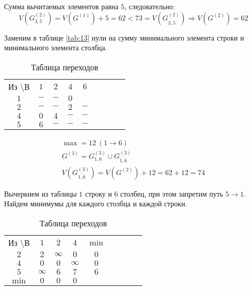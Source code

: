 Сумма вычитаемых элементов равна $5$, следовательно:
\begin{equation*}
V(G_{3,5}^{(2)}) = V(G^{(1)}) + 5 = 62 < 73 = V(G_{\overline{3,5}}^{(2)}) \Rightarrow V(G^{(2)}) = 62
\end{equation*}

Заменим в таблице \ref{tab:13} нули на сумму минимального элемента строки и минимального элемента столбца.

\begin{table}[H]
\begin{center}
	\def\tabcolsep{15pt}
	\caption{Таблица переходов}
	\label{tab:14}
	\begin{tabular}{|c||c|c|c|c|c|c|c|c|}
		\hline
		Из \textbackslash В & $1$ & $2$ & $4$ & $6$\\
		\hhline{|=#=|=|=|=|=|=|}
		$1$ & $-$ & $-$ & $0$ & \redbold{$12$} \\
		\hline
		$2$ & $-$ & $-$ & $2$ & $-$ \\
		\hline
		$4$ & $0$ & $4$ & $-$ & $-$ \\
		\hline
		$5$ & $6$ & $-$ & $-$ & $-$ \\
		\hline
	\end{tabular}
\end{center}
\end{table}

\begin{gather*}
\max = 12\ (1 \rightarrow 6) \\
G^{(3)} = G_{1,6}^{(3)} \cup G_{\overline{1,6}}^{(3)} \\
V(G_{\overline{1,6}}^{(3)}) = V(G^{(2)}) + 12 = 62 + 12 = 74
\end{gather*}

Вычеркнем из таблицы $1$ строку и $6$ столбец, при этом запретим путь $5 \rightarrow 1$. Найдем минимумы для каждого столбца и каждой строки.

\begin{table}[H]
\begin{center}
	\def\tabcolsep{15pt}
	\caption{Таблица переходов}
	\label{tab:15}
	\begin{tabular}{|c||c|c|c|c|c|c|c|c|}
		\hline
		Из \textbackslash В & $1$ & $2$ & $4$ & $\min$ \\
		\hhline{|=#=|=|=|=|=|=|}
		$2$ & $2$ & $\infty$ & $0$ & $0$ \\
		\hline
		$4$ & $0$ & $0$ & $\infty$ & $0$ \\
		\hline
		$5$ & $\infty$ & $6$ & $7$ & $6$ \\
		\hhline{|=#=|=|=|=|=|=|} 
		$\min$ & $0$ & $0$ & $0$ & \\ 
		\hline
	\end{tabular}
\end{center}
\end{table}

